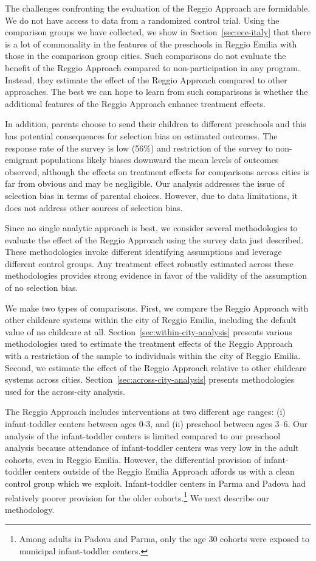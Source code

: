 The challenges confronting the evaluation of the Reggio Approach are formidable. We do not have access to data from a randomized control trial. Using the comparison groups we have collected, we show in Section~\ref{sec:ece-italy} that there is a lot of commonality in the features of the preschools in Reggio Emilia with those in the comparison group cities. Such comparisons do not evaluate the benefit of the Reggio Approach compared to non-participation in any program. Instead, they estimate the effect of the Reggio Approach compared to other approaches. The best we can hope to learn from such comparisons is whether the additional features of the Reggio Approach enhance treatment effects.

In addition, parents choose to send their children to different preschools and this has potential consequences for selection bias on estimated outcomes. The response rate of the survey is low (56\%) and restriction of the survey to non-emigrant populations likely biases downward the mean levels of outcomes observed, although the effects on treatment effects for comparisons across cities is far from obvious and may be negligible. Our analysis addresses the issue of selection bias in terms of parental choices. However, due to data limitations, it does not address other sources of selection bias.

Since no single analytic approach is best, we consider several methodologies to evaluate the effect of the Reggio Approach using the survey data just described. These methodologies invoke different identifying assumptions and leverage different control groups. Any treatment effect robustly estimated across these methodologies provides strong evidence in favor of the validity of the assumption of no selection bias.

We make two types of comparisons. First, we compare the Reggio Approach with other childcare systems within the city of Reggio Emilia, including the default value of no childcare at all. Section~\ref{sec:within-city-analysis} presents various methodologies used to estimate the treatment effects of the Reggio Approach with a restriction of the sample to individuals within the city of Reggio Emilia. Second, we estimate the effect of the Reggio Approach relative to other childcare systems across cities. Section~\ref{sec:across-city-analysis} presents methodologies used for the across-city analysis.

The Reggio Approach includes interventions at two different age ranges: (i) infant-toddler centers between ages 0-3, and (ii) preschool between ages 3--6. Our analysis of the infant-toddler centers is limited compared to our preschool analysis because attendance of infant-toddler centers was very low in the adult cohorts, even in Reggio Emilia. However, the differential provision of infant-toddler centers outside of the Reggio Emilia Approach affords us with a clean control group which we exploit. Infant-toddler centers in Parma and Padova had relatively poorer provision for the older cohorts.\footnote{Among adults in Padova and Parma, only the age 30 cohorts were exposed to municipal infant-toddler centers.} We next describe our methodology.

